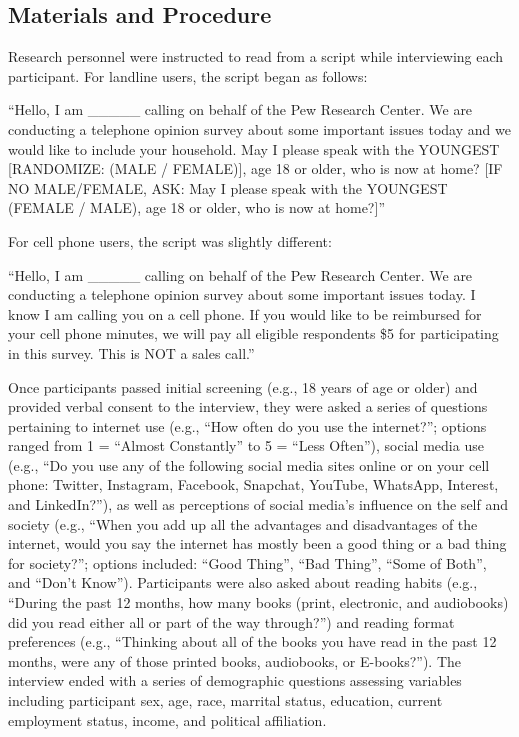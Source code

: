 \documentclass[man]{apa6}
\theoremstyle{definition}
\theoremstyle{definition}
\theoremstyle{definition}
\theoremstyle{remark}
\begin{document}
\subsection{Materials and Procedure}\label{materials-and-procedure}

Research personnel were instructed to read from a script while
interviewing each participant. For landline users, the script began as
follows:

\enquote{Hello, I am \_\_\_\_\_ calling on behalf of the Pew Research
Center. We are conducting a telephone opinion survey about some
important issues today and we would like to include your household. May
I please speak with the YOUNGEST {[}RANDOMIZE: (MALE / FEMALE){]}, age
18 or older, who is now at home? {[}IF NO MALE/FEMALE, ASK: May I please
speak with the YOUNGEST (FEMALE / MALE), age 18 or older, who is now at
home?{]}}

For cell phone users, the script was slightly different:

\enquote{Hello, I am \_\_\_\_\_ calling on behalf of the Pew Research
Center. We are conducting a telephone opinion survey about some
important issues today. I know I am calling you on a cell phone. If you
would like to be reimbursed for your cell phone minutes, we will pay all
eligible respondents \$5 for participating in this survey. This is NOT a
sales call.}

Once participants passed initial screening (e.g., 18 years of age or
older) and provided verbal consent to the interview, they were asked a
series of questions pertaining to internet use (e.g., \enquote{How often
do you use the internet?}; options ranged from 1 = \enquote{Almost
Constantly} to 5 = \enquote{Less Often}), social media use (e.g.,
\enquote{Do you use any of the following social media sites online or on
your cell phone: Twitter, Instagram, Facebook, Snapchat, YouTube,
WhatsApp, Interest, and LinkedIn?}), as well as perceptions of social
media's influence on the self and society (e.g., \enquote{When you add
up all the advantages and disadvantages of the internet, would you say
the internet has mostly been a good thing or a bad thing for society?};
options included: \enquote{Good Thing}, \enquote{Bad Thing},
\enquote{Some of Both}, and \enquote{Don't Know}). Participants were
also asked about reading habits (e.g., \enquote{During the past 12
months, how many books (print, electronic, and audiobooks) did you read
either all or part of the way through?}) and reading format preferences
(e.g., \enquote{Thinking about all of the books you have read in the
past 12 months, were any of those printed books, audiobooks, or
E-books?}). The interview ended with a series of demographic questions
assessing variables including participant sex, age, race, marrital
status, education, current employment status, income, and political
affiliation.
\end{document}
